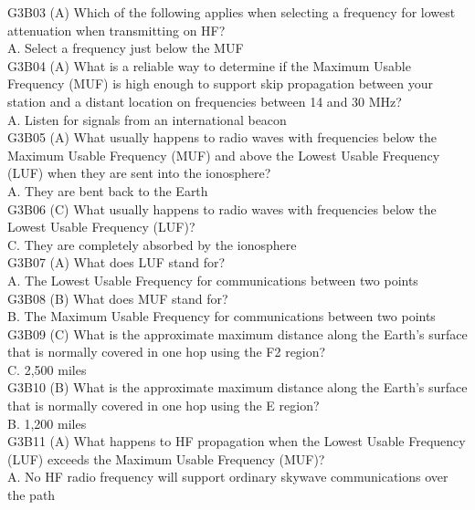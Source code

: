 \documentclass[12pt,letterpaper]{report}
\begin{document}
G3B03 (A) Which of the following applies when selecting a frequency for lowest attenuation when transmitting on HF?\\
A. Select a frequency just below the MUF\\

G3B04 (A) What is a reliable way to determine if the Maximum Usable Frequency (MUF) is high enough to support skip propagation between your station and a distant location on frequencies between 14 and 30 MHz?\\
A. Listen for signals from an international beacon\\

G3B05 (A) What usually happens to radio waves with frequencies below the Maximum Usable Frequency (MUF) and above the Lowest Usable Frequency (LUF) when they are sent into the ionosphere?\\
A. They are bent back to the Earth\\

G3B06 (C) What usually happens to radio waves with frequencies below the Lowest Usable Frequency (LUF)?\\
C. They are completely absorbed by the ionosphere\\

G3B07 (A) What does LUF stand for?\\
A. The Lowest Usable Frequency for communications between two points\\

G3B08 (B) What does MUF stand for?\\
B. The Maximum Usable Frequency for communications between two points\\

G3B09 (C) What is the approximate maximum distance along the Earth's surface that is normally covered in one hop using the F2 region?\\
C. 2,500 miles\\

G3B10 (B) What is the approximate maximum distance along the Earth's surface that is normally covered in one hop using the E region?\\
B. 1,200 miles \\

G3B11 (A) What happens to HF propagation when the Lowest Usable Frequency (LUF) exceeds the Maximum Usable Frequency (MUF)?\\
A. No HF radio frequency will support ordinary skywave communications over the path\\
\end{document}
